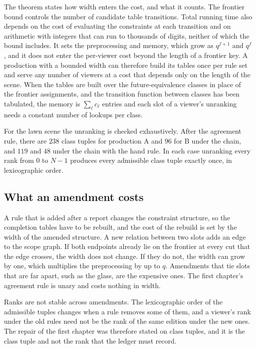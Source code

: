 \documentclass[11pt,twoside,openright]{book}
\theoremstyle{plain}
\theoremstyle{definition}
\theoremstyle{remark}
\begin{document}
The theorem states how width enters the cost, and what it counts. The frontier bound controls the number of candidate table transitions. Total running time also depends on the cost of evaluating the constraints at each transition and on arithmetic with integers that can run to thousands of digits, neither of which the bound includes. It sets the preprocessing and memory, which grow as $q^{f+1}$ and $q^f$, and it does not enter the per-viewer cost beyond the length of a frontier key. A production with a bounded width can therefore build its tables once per rule set and serve any number of viewers at a cost that depends only on the length of the scene. When the tables are built over the future-equivalence classes in place of the frontier assignments, and the transition function between classes has been tabulated, the memory is $\sum_\ell c_\ell$ entries and each slot of a viewer's unranking needs a constant number of lookups per class.

For the lawn scene the unranking is checked exhaustively. After the agreement rule, there are $238$ class tuples for production A and $96$ for B under the chain, and $119$ and $48$ under the chain with the hand rule. In each case unranking every rank from $0$ to $N-1$ produces every admissible class tuple exactly once, in lexicographic order.

\subsection{What an amendment costs}

A rule that is added after a report changes the constraint structure, so the completion tables have to be rebuilt, and the cost of the rebuild is set by the width of the amended structure. A new relation between two slots adds an edge to the scope graph. If both endpoints already lie on the frontier at every cut that the edge crosses, the width does not change. If they do not, the width can grow by one, which multiplies the preprocessing by up to $q$. Amendments that tie slots that are far apart, such as the glass, are the expensive ones. The first chapter's agreement rule is unary and costs nothing in width.

Ranks are not stable across amendments. The lexicographic order of the admissible tuples changes when a rule removes some of them, and a viewer's rank under the old rules need not be the rank of the same edition under the new ones. The repair of the first chapter was therefore stated on class tuples, and it is the class tuple and not the rank that the ledger must record.
\end{document}
